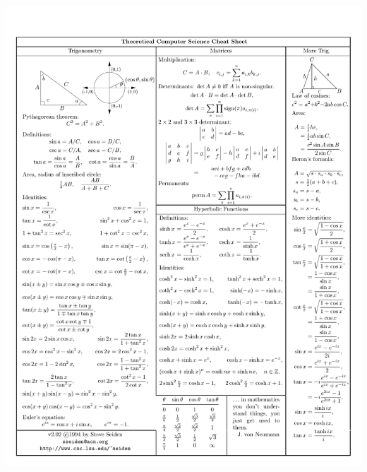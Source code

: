 \documentclass[10pt]{article}
\begin{document}
\centerline{\includegraphics[trim={0 0 0 3cm}, clip, width=\textwidth]{cheatsheet/p04.pdf}}
\end{document}

